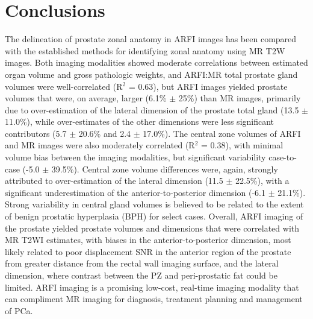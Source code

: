 \section{Conclusions}
The delineation of prostate zonal anatomy in ARFI images has been compared with
the established methods for identifying zonal anatomy using MR T2W images.
Both imaging modalities showed moderate correlations between estimated organ
volume and gross pathologic weights, and ARFI:MR total prostate gland volumes
were well-correlated (R$^2$ = 0.63), but ARFI images yielded prostate volumes
that were, on average, larger (6.1\% $\pm$ 25\%) than MR images, primarily due
to over-estimation of the lateral dimension of the prostate total gland (13.5
$\pm$ 11.0\%), while over-estimates of the other dimensions were less
significant contributors (5.7 $\pm$ 20.6\% and 2.4 $\pm$ 17.0\%).  The central
zone volumes of ARFI and MR images were also moderately correlated (R$^2$ =
0.38), with minimal volume bias between the imaging modalities, but significant
variability case-to-case (-5.0 $\pm$ 39.5\%).  Central zone volume differences
were, again, strongly attributed to over-estimation of the lateral dimension
(11.5 $\pm$ 22.5\%), with a significant underestimation of the
anterior-to-posterior dimension (-6.1 $\pm$ 21.1\%).  Strong variability in
central gland volumes is believed to be related to the extent of benign
prostatic hyperplasia (BPH) for select cases.  Overall, ARFI imaging of the
prostate yielded prostate volumes and dimensions that were correlated with MR
T2WI estimates, with biases in the anterior-to-posterior dimension, most likely
related to poor displacement SNR in the anterior region of the prostate from
greater distance from the rectal wall imaging surface, and the lateral
dimension, where contrast between the PZ and peri-prostatic fat could be
limited.  ARFI imaging is a promising low-cost, real-time imaging modality that
can compliment MR imaging for diagnosis, treatment planning and management of
PCa.
